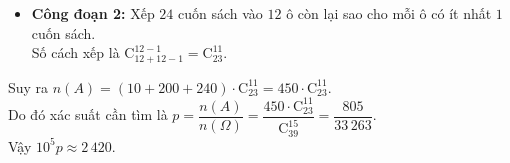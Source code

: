 \begin{ex}
{\begin{itemize}
\begin{itemize}
\begin{itemize}
					Chọn $2$ ô trống nằm ở $2$ đầu của cột thứ nhất có $1$ cách chọn.
					
					Chọn $2$ ô trống \textbf{không} cạnh nhau ở $6$ vị trí chính giữa của cột còn lại có $\mathrm{C}_5^2$ cách.
					
					Số cách chọn là $\mathrm{C}_5^2 = 10$ cách.
					\item \textbf{Trường hợp 3.2:}
					
					Chọn $1$ ô trống ở đầu hoặc cuối và $1$ ô trống bên trong của cột thứ nhất có $2 \cdot 5 = 10$ cách.
					
					Chọn $2$ ô trống ở cột còn lại có $\mathrm{C}_6^2 - 4 = 11$ cách.
					
					Số cách chọn là $10 \cdot 11 = 110$ cách.
					\item \textbf{Trường hợp 3.3:}
					
					Chọn $2$ ô trống \textbf{không} cạnh nhau bên trong của cột thứ nhất có $\mathrm{C}_5^2 = 10$ cách.
					
					Chọn $2$ ô trống ở cột còn lại có $\mathrm{C}_7^2 - 9 = 12$ cách.
					
					Số cách chọn là $10 \cdot 12 = 120$ cách.
				\end{itemize}
				Như vậy, \textbf{Trường hợp 3} có tất cả $240$ cách.
			\end{itemize}
			\item \textbf{Công đoạn 2:} Xếp $24$ cuốn sách vào $12$ ô còn lại sao cho mỗi ô có ít nhất $1$ cuốn sách.\\
			Số cách xếp là $\mathrm{C}_{12+12-1}^{12-1} = \mathrm{C}_{23}^{11}$.
		\end{itemize}
		Suy ra $n(A) = \left(10 + 200 + 240\right) \cdot \mathrm{C}_{23}^{11} = 450 \cdot \mathrm{C}_{23}^{11}$.\\
		Do đó xác suất cần tìm là $p = \dfrac{n(A)}{n(\Omega)} = \dfrac{450 \cdot \mathrm{C}_{23}^{11}}{\mathrm{C}_{39}^{15}} = \dfrac{805}{33\,263}$. \\
		Vậy $10^5 p \approx 2\,420$.
	}
\end{ex}


